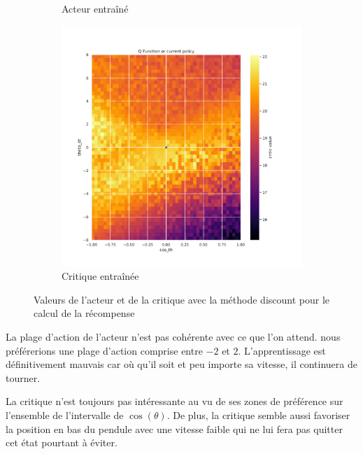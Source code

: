 \begin{figure}[H]
\begin{subfigure}{0.3\textwidth}
        \caption{Acteur entraîné}
    \end{subfigure}
    \begin{subfigure}{0.3\textwidth}
        \includegraphics[width=\textwidth]{figures/iteration3/0_critic_discount_post_Pendulum-v0.pdf}
        \caption{Critique entraînée}
    \end{subfigure}
    \caption{Valeurs de l'acteur et de la critique avec la méthode discount pour le calcul de la récompense}
    \label{fig:itr3_discount}
\end{figure}

La plage d'action de l'acteur n'est pas cohérente avec ce que l'on attend. nous préférerions une plage d'action comprise entre $-2$ et $2$. L'apprentissage est définitivement mauvais car où qu'il soit et peu importe sa vitesse, il continuera de tourner.

La critique n'est toujours pas intéressante au vu de ses zones de préférence sur l'ensemble de l'intervalle de $\cos(\theta)$. De plus, la critique semble aussi favoriser la position en bas du pendule avec une vitesse faible qui ne lui fera pas quitter cet état pourtant à éviter.

